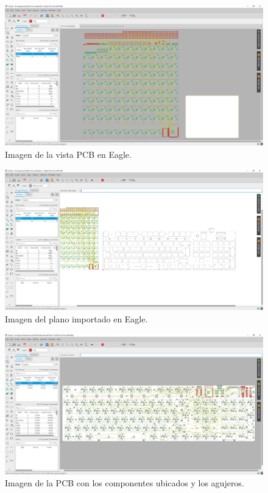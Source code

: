 \begin{figure}[H]
    \centering
    \includegraphics[width=1\textwidth]{imagenes/Capitulos/Cap05/EaglePCBNueva.png}
    \caption{Imagen de la vista \gls{PCB} en Eagle.}
    \label{fig:EaglePCBNueva}
\end{figure}

\begin{figure}[H]
    \centering
    \includegraphics[width=1\textwidth]{imagenes/Capitulos/Cap05/EaglePCBPlano.png}
    \caption{Imagen del plano importado en Eagle.}
    \label{fig:EaglePCBPlano}
\end{figure}

\begin{figure}[H]
    \centering
    \includegraphics[width=1\textwidth]{imagenes/Capitulos/Cap05/EaglePCBPartesColocadas.png}
    \caption{Imagen de la \gls{PCB} con los componentes ubicados y los agujeros.}
    \label{fig:EaglePCBPartesColocadas}
\end{figure}

